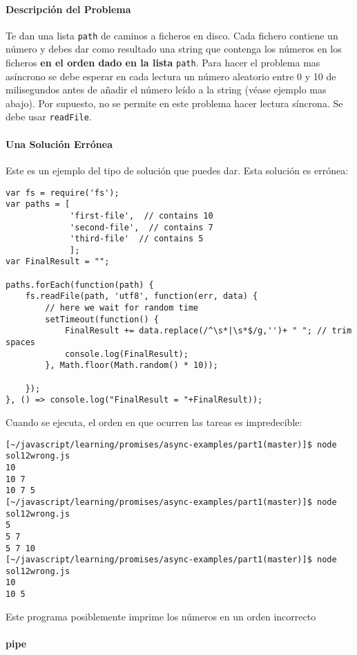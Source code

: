 \paragraph{Descripción del Problema}\label{descripciuxf3n-del-problema}

Te dan una lista \verb|path| de caminos a ficheros en disco. Cada fichero contiene
un número y debes dar como resultado una string que contenga los números 
en los ficheros {\bf en el orden dado en la lista} \verb|path|. 
Para hacer el problema mas asíncrono se debe esperar en cada lectura un número aleatorio
entre 0 y 10 de milisegundos antes de añadir el número leído a la string (véase ejemplo mas abajo).
Por supuesto, no se permite en este problema hacer lectura síncrona. Se debe usar
\texttt{readFile}.

\paragraph{Una Solución Errónea}\label{una-soluciuxf3n-erruxf3nea}

Este es un ejemplo del tipo de solución que puedes dar. Esta solución es
errónea:

\begin{verbatim}
var fs = require('fs');
var paths = [
             'first-file',  // contains 10
             'second-file',  // contains 7
             'third-file'  // contains 5
             ];
var FinalResult = "";

paths.forEach(function(path) {
    fs.readFile(path, 'utf8', function(err, data) {
        // here we wait for random time
        setTimeout(function() {
            FinalResult += data.replace(/^\s*|\s*$/g,'')+ " "; // trim spaces
            console.log(FinalResult);
        }, Math.floor(Math.random() * 10));

    });
}, () => console.log("FinalResult = "+FinalResult));
\end{verbatim}
\pagebreak{}
Cuando se ejecuta, el orden en que ocurren las tareas es impredecible:
\begin{verbatim}
[~/javascript/learning/promises/async-examples/part1(master)]$ node sol12wrong.js 
10 
10 7 
10 7 5 
[~/javascript/learning/promises/async-examples/part1(master)]$ node sol12wrong.js 
5 
5 7 
5 7 10 
[~/javascript/learning/promises/async-examples/part1(master)]$ node sol12wrong.js 
10 
10 5 
\end{verbatim}
Este programa posiblemente imprime los números en un orden incorrecto

\paragraph{pipe}\label{pipe}

